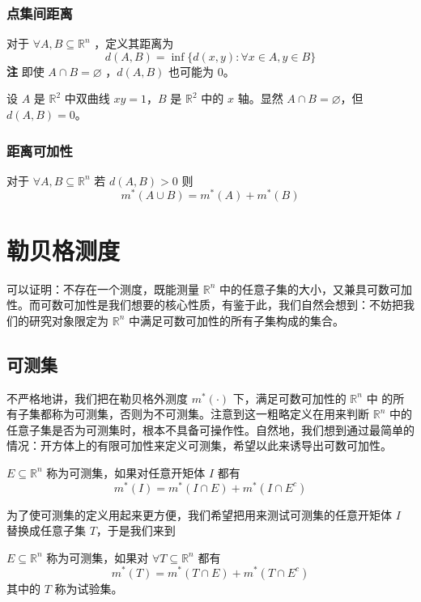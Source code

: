 \documentclass{ctexbook}
\newcommand{\no}{\noindent}
\newcommand{\EXP}{\no {\bf 例}\quad}
\newcommand{\R}{\mathbb{R}}
\begin{document}
\subsubsection{点集间距离}

对于 $\forall A,B \subseteq \R^n$ ，定义其距离为
\[
d(A,B) = \inf \{d(x,y):\forall x \in A ,y \in B\}
\]
{\bf 注} 即使 $A\cap B = \varnothing$ ，$d(A,B)$ 也可能为 $0$。

\bigskip

\EXP 设 $A$ 是 $\R^2$ 中双曲线 $xy=1$，$B$ 是 $\R^2$ 中的 $x$ 轴。显然 $A\cap B = \varnothing$，但 $d(A,B)=0$。 

\subsubsection{距离可加性}

对于 $\forall A,B \subseteq \R^n$ 若 $d(A,B) > 0$ 则
\[
m^*(A\cup B) = m^*(A) + m^*(B) 
\]

\section{勒贝格测度}

可以证明：不存在一个测度，既能测量 $\R^n$ 中的任意子集的大小，又兼具可数可加性。而可数可加性是我们想要的核心性质，有鉴于此，我们自然会想到：不妨把我们的研究对象限定为 $\R^n$ 中满足可数可加性的所有子集构成的集合。

\subsection{可测集}

不严格地讲，我们把在勒贝格外测度 $m^*(\cdot)$ 下，满足可数可加性的 $\R^n$ 中 的所有子集都称为可测集，否则为不可测集。注意到这一粗略定义在用来判断 $\R^n$ 中的任意子集是否为可测集时，根本不具备可操作性。自然地，我们想到通过最简单的情况：开方体上的有限可加性来定义可测集，希望以此来诱导出可数可加性。

\smallskip

\no {\bf 定义1：}

$E \subseteq \R^n$ 称为可测集，如果对任意开矩体 $I$ 都有
\[
m^*(I) = m^*(I\cap E) + m^*(I\cap E^c)
\]

为了使可测集的定义用起来更方便，我们希望把用来测试可测集的任意开矩体 $I$ 替换成任意子集 $T$，于是我们来到\\
\no {\bf 定义2：}

$E \subseteq \R^n$ 称为可测集，如果对 $\forall T \subseteq \R^n$ 都有
\[
m^*(T) = m^*(T\cap E) + m^*(T\cap E^c)
\]
其中的 $T$ 称为试验集。
\end{document}
